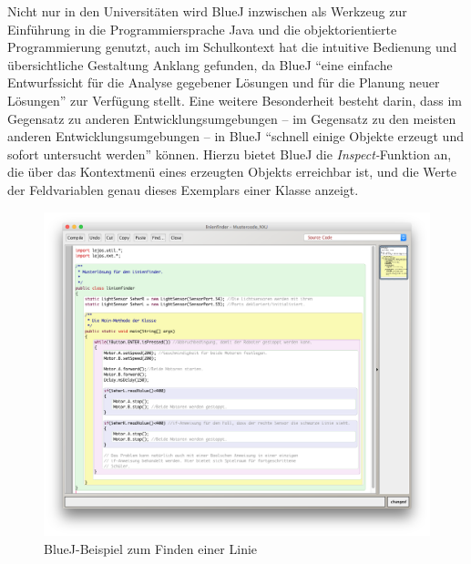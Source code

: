 \documentclass[paper=a4, DIV=calc, BCOR=15mm, twoside=on, onecolumn=on, open = right, titlepage =on, parskip =half, headsepline = on, footsepline = on, chapterprefix = off, appendixprefix = off, fontsize = 12pt, numbers = noenddot, abstract = on]{scrbook}
\begin{document}
Nicht nur in den Universitäten wird BlueJ inzwischen als Werkzeug zur Einführung in die Programmiersprache Java und die objektorientierte Programmierung genutzt, auch im Schulkontext hat die intuitive Bedienung und übersichtliche Gestaltung Anklang gefunden, da BlueJ "`eine einfache Entwurfssicht für die Analyse gegebener Lösungen und für die Planung neuer Lösungen"' \cite[S.6]{ehmann:09} zur Verfügung stellt. Eine weitere Besonderheit besteht darin, dass im Gegensatz zu anderen Entwicklungsumgebungen -- im Gegensatz zu den meisten anderen Entwicklungsumgebungen -- in BlueJ "`schnell einige Objekte erzeugt und sofort untersucht werden"' \cite[S.6]{ehmann:09} können. Hierzu bietet BlueJ die \emph{Inspect-}Funktion an, die über das Kontextmenü eines erzeugten Objekts erreichbar ist, und die Werte der Feldvariablen genau dieses Exemplars einer Klasse anzeigt.

\begin{figure}[htpb]
\centering
\includegraphics[width=\textwidth]{images/linienfinder_bluej.png} 
\caption{BlueJ-Beispiel zum Finden einer Linie}
\label{fig:Bsp BlueJ Linienfinder}
\end{figure}


\par \singlespacing
\end{document}
